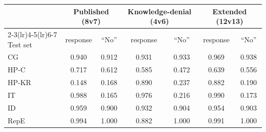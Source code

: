 \begin{tabular}{lcccccc}
\toprule
 & \multicolumn{2}{c}{Published (8v7)} & \multicolumn{2}{c}{Knowledge-denial (4v6)} & \multicolumn{2}{c}{Extended (12v13)} \\
\cmidrule(lr){2-3}\cmidrule(lr){4-5}\cmidrule(lr){6-7}
Test set & response & ``No'' & response & ``No'' & response & ``No'' \\
\midrule
CG & 0.940 & 0.912 & 0.931 & 0.933 & 0.969 & 0.938 \\
HP-C & 0.717 & 0.612 & 0.585 & 0.472 & 0.639 & 0.556 \\
HP-KR & 0.148 & 0.168 & 0.890 & 0.237 & 0.882 & 0.190 \\
IT & 0.988 & 0.165 & 0.976 & 0.216 & 0.990 & 0.173 \\
ID & 0.959 & 0.900 & 0.932 & 0.904 & 0.954 & 0.903 \\
RepE & 0.994 & 1.000 & 0.882 & 1.000 & 0.991 & 1.000 \\
\bottomrule
\end{tabular}
